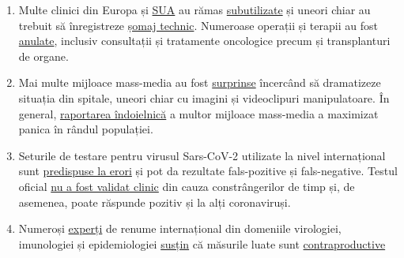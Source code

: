\begin{enumerate}
{  științifică}. Experții
  \href{https://www.aerztezeitung.de/Politik/Montgomery-haelt-Maskenpflicht-fuer-falsch-408844.html}{avertizează}
  mai degrabă, că astfel de măști afecteză respirația și devin
  „\href{https://de.sputniknews.com/interviews/20200425326953541-corona-gefahr-virologe/}{purtătoare
  de germeni}''
  (\href{https://www.cidrap.umn.edu/news-perspective/2020/04/commentary-masks-all-covid-19-not-based-sound-data}{mai
  multe} despre aceasta).
\item
  Multe clinici din Europa și
  \href{https://eu.usatoday.com/story/news/health/2020/04/02/coronavirus-pandemic-jobs-us-health-care-workers-furloughed-laid-off/5102320002/}{SUA}
  au rămas
  \href{https://www.spiegel.de/wirtschaft/unternehmen/trotz-corona-pandemie-warum-kliniken-jetzt-kurzarbeit-anmelden-a-3dc61bc9-fb12-4298-8022-bb4c2be39d7d}{subutilizate}
  și uneori chiar au trebuit să înregistreze
  \href{https://www.20min.ch/story/jetzige-kurzarbeit-von-spitaelern-klingt-paradox-519453057614}{șomaj
  technic}. Numeroase operații și terapii au fost
  \href{https://www.zeit.de/2020/18/kliniken-coronavirus-intensivbetten-patienten-behandlung-notaufnahme}{anulate},
  inclusiv consultații și tratamente oncologice precum și transplanturi
  de organe.
\item
  Mai multe mijloace mass-media au fost
  \href{https://nypost.com/2020/04/01/cbs-admits-to-using-footage-from-italy-in-report-about-nyc/}{surprinse}
  încercând să dramatizeze situația din spitale, uneori chiar cu imagini
  și videoclipuri manipulatoare. În general,
  \href{https://www.infosperber.ch/Artikel/Medien/Corona-Medien-verbreiten-weiter-unbeirrt-statistischen-Unsinn}{raportarea
  îndoielnică} a multor mijloace mass-media a maximizat panica în rândul
  populației.
\item
  Seturile de testare pentru virusul Sars-CoV-2 utilizate la nivel
  internațional sunt
  \href{https://pubmed.ncbi.nlm.nih.gov/32219885/}{predispuse la erori}
  și pot da rezultate fals-pozitive și fals-negative. Testul oficial
  \href{https://www.youtube.com/watch?v=p_AyuhbnPOI}{nu a fost validat
  clinic} din cauza constrângerilor de timp și, de asemenea, poate
  răspunde pozitiv și la alți coronaviruși.
\item
  Numeroși
  \href{https://www.rubikon.news/artikel/120-expertenstimmen-zu-corona}{experți}
  de renume internațional din domeniile virologiei, imunologiei și
  epidemiologiei
  \href{https://off-guardian.org/2020/03/24/12-experts-questioning-the-coronavirus-panic/}{susțin}
  că măsurile luate sunt
  \href{https://off-guardian.org/2020/03/28/10-more-experts-criticising-the-coronavirus-panic/}{contraproductive}

\end{enumerate}
